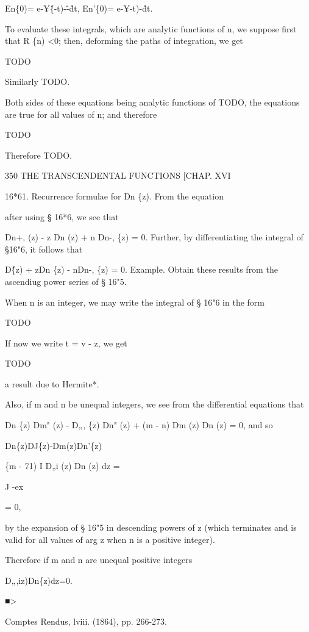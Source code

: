 En\{0)= e-¥\^\{-t)-\^-\^dt, En'\{0)= e-¥-t)-\^dt.

To evaluate these integrals, which are analytic functions of n, we
suppose first that R \{n) <0; then, deforming the paths of
integration, we get

TODO

Similarly TODO.

Both sides of these equations being analytic functions of TODO, the
equations are true for all values of n; and therefore

TODO

Therefore TODO.

350 THE TRANSCENDENTAL FUNCTIONS [CHAP. XVI

16*61. Recurrence formulae for Dn \{z). From the equation

after using § 16*6, we see that

Dn+, (z) - z Dn (z) + n Dn-, \{z) = 0. Further, by differentiating the
integral of §16"6, it follows that

D\^ \{z) + zDn \{z) - nDn-, \{z) = 0. Example. Obtain these results
from the ascendiug power series of § 16"5.


When n is an integer, we may write the integral of § 16"6 in the form

TODO

If now we write t = v - z, we get

TODO

a result due to Hermite*.

Also, if m and n be unequal integers, we see from the differential
equations that

Dn \{z) Dm" (z) - D„, \{z) Dn" (z) + (m - n) Dm (z) Dn (z) = 0, and so

Dn\{z)DJ\{z)-Dm(z)Dn'\{z)

\{m - 71) I D„i (z) Dn (z) dz =

J -ex

= 0,

by the expansion of § 16"5 in descending powers of z (which terminates
and is valid for all values of arg z when n is a positive integer).

Therefore if m and n are unequal positive integers

D„,iz)Dn\{z)dz=0.

■>

Comptes Rendus, lviii. (1864), pp. 266-273.

%
%

